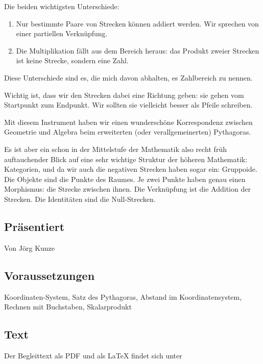 \documentclass[a4paper]{amsart}
\theoremstyle{definition}
\begin{document}
Die beiden wichtigsten Unterschiede:
\begin{enumerate}
   \item Nur bestimmte Paare von Strecken können addiert werden. Wir sprechen von einer partiellen Verknüpfung.
   \item Die Multiplikation fällt aus dem Bereich heraus: das Produkt zweier Strecken ist keine Strecke, sondern eine Zahl.
\end{enumerate} 

Diese Unterschiede sind es, die mich davon abhalten, es Zahlbereich zu nennen.

Wichtig ist, dass wir den Strecken dabei eine Richtung geben: sie gehen vom Startpunkt zum Endpunkt. Wir sollten sie vielleicht besser als Pfeile schreiben.

Mit diesem Instrument haben wir einen wunderschöne Korrespondenz zwischen Geometrie und Algebra beim erweiterten (oder verallgemeinerten) Pythagoras.

Es ist aber ein schon in der Mittelstufe der Mathematik also recht früh auftauchender Blick auf eine sehr wichtige Struktur der höheren Mathematik: Kategorien, und da wir auch die negativen Strecken haben sogar ein: Gruppoide. Die Objekte sind die Punkte des Raumes. Je zwei Punkte haben genau einen Morphismus: die Strecke zwischen ihnen. Die Verknüpfung ist die Addition der Strecken. Die Identitäten sind die Null-Strecken.

\subsection*{Präsentiert}
Von Jörg Kunze

\subsection*{Voraussetzungen}
Koordinaten-System, Satz des Pythagoras, Abstand im Koordinatensystem, Rechnen mit Buchstaben, Skalarprodukt

\subsection*{Text}
Der Begleittext als PDF und als LaTeX findet sich unter
{\tiny
   \url{}
}
\end{document}
